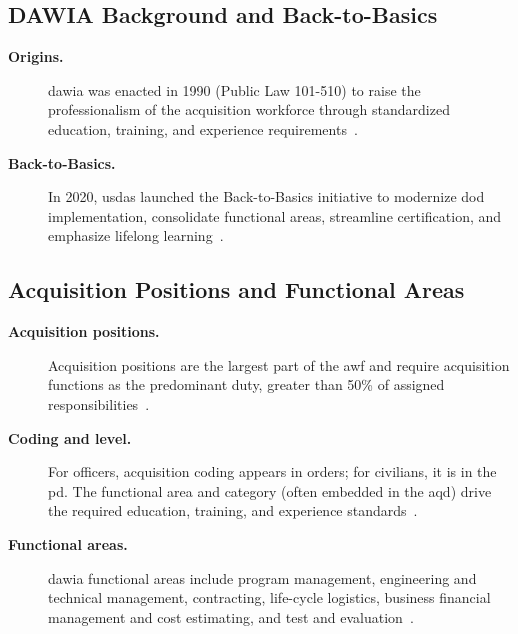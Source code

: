 \documentclass[../main.tex]{subfiles}
\begin{document}
\subsection{DAWIA Background and Back-to-Basics}
\begin{description}
  \item[\textbf{Origins.}] \ac{dawia} was enacted in 1990 (Public Law 101-510) to raise the professionalism of
  the acquisition workforce through standardized education, training, and experience requirements~\autocite{edo-5-2-1-dawia-2025}.
  \item[\textbf{Back-to-Basics.}] In 2020, \ac{usdas} launched the Back-to-Basics initiative to modernize
  \ac{dod} implementation, consolidate functional areas, streamline certification, and emphasize lifelong learning~\autocite{edo-5-2-1-dawia-2025,OUSD-Back-to-Basics-2020}.
\end{description}

\subsection{Acquisition Positions and Functional Areas}
\begin{description}
  \item[\textbf{Acquisition positions.}] Acquisition positions are the largest part of the \ac{awf} and require
  acquisition functions as the predominant duty, greater than 50\% of assigned responsibilities~\autocite{edo-5-2-1-dawia-2025,DoDI-5000-66-DAWIA-2022}.
  \item[\textbf{Coding and level.}] For officers, acquisition coding appears in orders; for civilians, it is in the
  \ac{pd}. The functional area and category (often embedded in the \ac{aqd}) drive the required education,
  training, and experience standards~\autocite{edo-5-2-1-dawia-2025,DoDI-5000-66-DAWIA-2022}.
  \item[\textbf{Functional areas.}] \ac{dawia} functional areas include program management, engineering and
  technical management, contracting, life-cycle logistics, business financial management and cost
  estimating, and test and evaluation~\autocite{edo-5-2-1-dawia-2025}.
\end{description}
\end{document}
